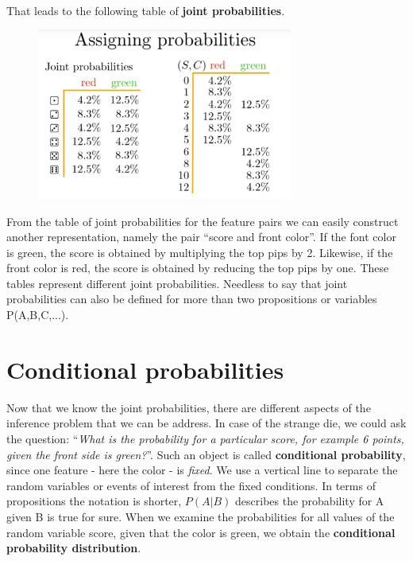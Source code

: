 \documentclass[12pt, a4paper]{scrartcl}
\begin{document}
\\

That leads to the following table of \textbf{joint probabilities}. %
\begin{figure}[H]
	\centering
	\includegraphics[width=0.75\textwidth]{3_5.png}
\end{figure}
From the table of joint probabilities for the feature pairs we can easily construct another representation, namely the pair ``score and front color''.
If the font color is green, the score is obtained by multiplying the top pips by 2.
Likewise, if the front color is red, the score is obtained by reducing the top pips by one.
These tables represent different joint probabilities. 
Needless to say that joint probabilities can also be defined for more than two propositions or variables P(A,B,C,...).\\

\section*{Conditional probabilities}
Now that we know the joint probabilities, there are different aspects of the inference problem that we can be address.
In case of the strange die, we could ask the question:  
``\textit{What is the probability for a particular score, for example 6 points, given the front side is green?}''.
Such an object is called \textbf{conditional probability}, since one feature - here the color - is \textit{fixed}. 
We use a vertical line to separate the random variables or events of interest from the fixed conditions. In terms of propositions the notation is shorter, $P(A|B)$ describes the probability for A given B is true for sure.
When we examine the probabilities for all values of the random variable score, given that the color is green, we obtain the \textbf{conditional probability distribution}.\\
\end{document}
